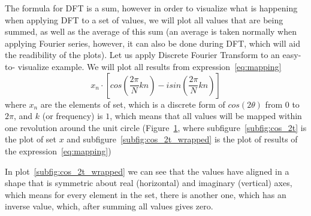 \documentclass[titlepage]{article}
\begin{document}
    The formula for DFT is a sum, however in order to visualize what is happening
    when applying DFT to a set of values, we will plot all values that are being
    summed, as well as the average of this sum (an average is taken normally when
    applying Fourier series, however, it can also be done during DFT, which will
    aid the readibility of the plots).
    Let us apply Discrete Fourier Transform to an easy-to-
    visualize example. We will plot all results from expression~\eqref{eq:mapping}
    \begin{equation}\label{eq:mapping}
        x_n \cdot \left[cos\left(\frac{2\pi}{N}kn\right) - isin\left(
            \frac{2\pi}{N}kn\right)\right]
    \end{equation}
    where $x_n$ are the elements of set, which is a discrete
    form of $cos(2\theta)$ from $0$ to $2\pi$, and $k$ (or frequency) is $1$, which 
    means that all values will be mapped within one revolution around the unit circle
    (Figure~\ref{fig:cos_wrapped}, where subfigure~\ref{subfig:cos_2t} is the plot
    of set $x$ and subfigure~\ref{subfig:cos_2t_wrapped} is the plot of results
    of the expression~\eqref{eq:mapping})
    \begin{figure}[H]
      \caption{}\label{fig:cos_wrapped}
      \centering
      \hfill
    \end{figure}
    In plot~\ref{subfig:cos_2t_wrapped} we can see that the values have aligned
    in a shape that is symmetric about real (horizontal) and imaginary (vertical)
    axes, which means for every element in the set, there is another one, which
    has an inverse value, which, after summing all values gives zero. 
\end{document}
